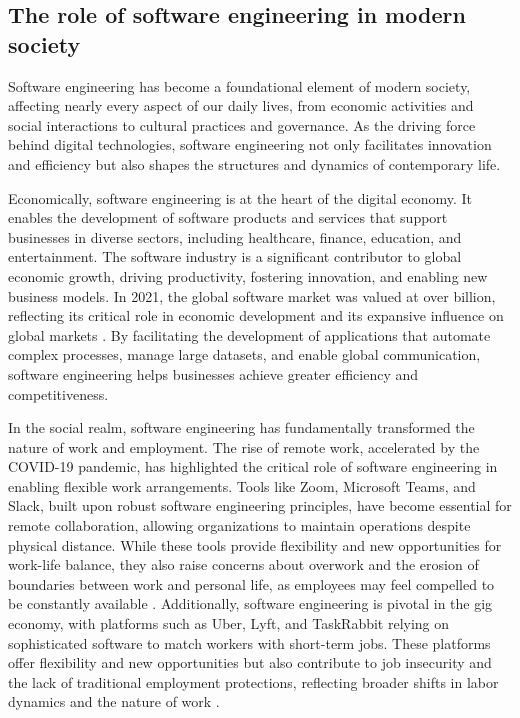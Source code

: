 \begin{refsection}
\subsection{The role of software engineering in modern society}

Software engineering has become a foundational element of modern society, affecting nearly every aspect of our daily lives, from economic activities and social interactions to cultural practices and governance. As the driving force behind digital technologies, software engineering not only facilitates innovation and efficiency but also shapes the structures and dynamics of contemporary life.

Economically, software engineering is at the heart of the digital economy. It enables the development of software products and services that support businesses in diverse sectors, including healthcare, finance, education, and entertainment. The software industry is a significant contributor to global economic growth, driving productivity, fostering innovation, and enabling new business models. In 2021, the global software market was valued at over  billion, reflecting its critical role in economic development and its expansive influence on global markets \cite[pp.~12-15]{schwab2017fourth}. By facilitating the development of applications that automate complex processes, manage large datasets, and enable global communication, software engineering helps businesses achieve greater efficiency and competitiveness.

In the social realm, software engineering has fundamentally transformed the nature of work and employment. The rise of remote work, accelerated by the COVID-19 pandemic, has highlighted the critical role of software engineering in enabling flexible work arrangements. Tools like Zoom, Microsoft Teams, and Slack, built upon robust software engineering principles, have become essential for remote collaboration, allowing organizations to maintain operations despite physical distance. While these tools provide flexibility and new opportunities for work-life balance, they also raise concerns about overwork and the erosion of boundaries between work and personal life, as employees may feel compelled to be constantly available \cite[pp.~94-96]{schwab2020reset}. Additionally, software engineering is pivotal in the gig economy, with platforms such as Uber, Lyft, and TaskRabbit relying on sophisticated software to match workers with short-term jobs. These platforms offer flexibility and new opportunities but also contribute to job insecurity and the lack of traditional employment protections, reflecting broader shifts in labor dynamics and the nature of work \cite[pp.~11-14]{baldwin2019globotics}.


\end{refsection}
